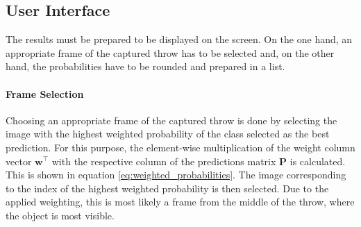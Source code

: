 \subsection{User Interface}
\label{subsec:inference:app:ui}

The results must be prepared to be displayed on the screen.
On the one hand, an appropriate frame of the captured throw has to be selected and, on the other hand, the probabilities have to be rounded and prepared in a list.

\paragraph{Frame Selection}
Choosing an appropriate frame of the captured throw is done by selecting the image with the highest weighted probability of the class selected as the best prediction. %
For this purpose, the element-wise multiplication of the weight column vector $\boldsymbol{w}^\top$ with the respective column of the predictions matrix $\boldsymbol{P}$ is calculated.
This is shown in equation \ref{eq:weighted_probabilities}.
The image corresponding to the index of the highest weighted probability is then selected.
Due to the applied weighting, this is most likely a frame from the middle of the throw, where the object is most visible.

